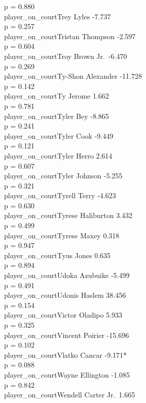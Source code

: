 \documentclass[
  landscape]{article}
\begin{document}
p = 0.880\\
player\_on\_courtTrey Lyles -7.737\\
p = 0.257\\
player\_on\_courtTristan Thompson -2.597\\
p = 0.604\\
player\_on\_courtTroy Brown Jr.~-6.470\\
p = 0.269\\
player\_on\_courtTy-Shon Alexander -11.728\\
p = 0.142\\
player\_on\_courtTy Jerome 1.662\\
p = 0.781\\
player\_on\_courtTyler Bey -8.865\\
p = 0.241\\
player\_on\_courtTyler Cook -9.449\\
p = 0.121\\
player\_on\_courtTyler Herro 2.614\\
p = 0.607\\
player\_on\_courtTyler Johnson -5.255\\
p = 0.321\\
player\_on\_courtTyrell Terry -4.623\\
p = 0.630\\
player\_on\_courtTyrese Haliburton 3.432\\
p = 0.499\\
player\_on\_courtTyrese Maxey 0.318\\
p = 0.947\\
player\_on\_courtTyus Jones 0.635\\
p = 0.894\\
player\_on\_courtUdoka Azubuike -5.499\\
p = 0.491\\
player\_on\_courtUdonis Haslem 38.456\\
p = 0.154\\
player\_on\_courtVictor Oladipo 5.933\\
p = 0.325\\
player\_on\_courtVincent Poirier -15.696\\
p = 0.102\\
player\_on\_courtVlatko Cancar -9.171*\\
p = 0.088\\
player\_on\_courtWayne Ellington -1.085\\
p = 0.842\\
player\_on\_courtWendell Carter Jr.~1.665\\
\end{document}

